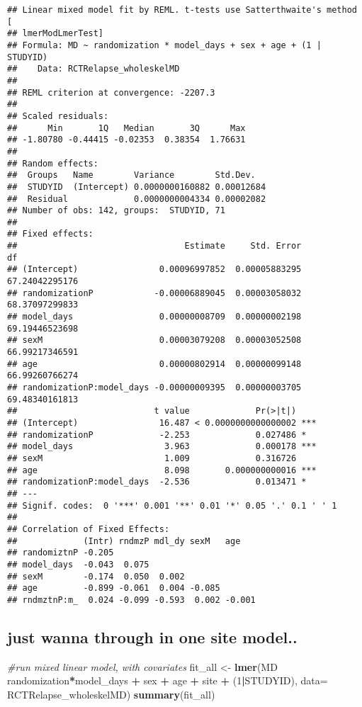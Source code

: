 \documentclass[]{article}
\newenvironment{Shaded}{\begin{snugshade}}{\end{snugshade}}
\newcommand{\KeywordTok}[1]{\textcolor[rgb]{0.13,0.29,0.53}{\textbf{#1}}}
\newcommand{\DataTypeTok}[1]{\textcolor[rgb]{0.13,0.29,0.53}{#1}}
\newcommand{\DecValTok}[1]{\textcolor[rgb]{0.00,0.00,0.81}{#1}}
\newcommand{\StringTok}[1]{\textcolor[rgb]{0.31,0.60,0.02}{#1}}
\newcommand{\CommentTok}[1]{\textcolor[rgb]{0.56,0.35,0.01}{\textit{#1}}}
\newcommand{\OperatorTok}[1]{\textcolor[rgb]{0.81,0.36,0.00}{\textbf{#1}}}
\newcommand{\NormalTok}[1]{#1}
\theoremstyle{definition}
\theoremstyle{definition}
\theoremstyle{definition}
\theoremstyle{remark}
\begin{document}
\begin{verbatim}
## Linear mixed model fit by REML. t-tests use Satterthwaite's method [
## lmerModLmerTest]
## Formula: MD ~ randomization * model_days + sex + age + (1 | STUDYID)
##    Data: RCTRelapse_wholeskelMD
## 
## REML criterion at convergence: -2207.3
## 
## Scaled residuals: 
##      Min       1Q   Median       3Q      Max 
## -1.80780 -0.44415 -0.02353  0.38354  1.76631 
## 
## Random effects:
##  Groups   Name        Variance        Std.Dev.  
##  STUDYID  (Intercept) 0.0000000160882 0.00012684
##  Residual             0.0000000004334 0.00002082
## Number of obs: 142, groups:  STUDYID, 71
## 
## Fixed effects:
##                                 Estimate     Std. Error             df
## (Intercept)                0.00096997852  0.00005883295 67.24042295176
## randomizationP            -0.00006889045  0.00003058032 68.37097299833
## model_days                 0.00000008709  0.00000002198 69.19446523698
## sexM                       0.00003079208  0.00003052508 66.99217346591
## age                        0.00000802914  0.00000099148 66.99260766274
## randomizationP:model_days -0.00000009395  0.00000003705 69.48340161813
##                           t value             Pr(>|t|)    
## (Intercept)                16.487 < 0.0000000000000002 ***
## randomizationP             -2.253             0.027486 *  
## model_days                  3.963             0.000178 ***
## sexM                        1.009             0.316726    
## age                         8.098       0.000000000016 ***
## randomizationP:model_days  -2.536             0.013471 *  
## ---
## Signif. codes:  0 '***' 0.001 '**' 0.01 '*' 0.05 '.' 0.1 ' ' 1
## 
## Correlation of Fixed Effects:
##             (Intr) rndmzP mdl_dy sexM   age   
## randomiztnP -0.205                            
## model_days  -0.043  0.075                     
## sexM        -0.174  0.050  0.002              
## age         -0.899 -0.061  0.004 -0.085       
## rndmztnP:m_  0.024 -0.099 -0.593  0.002 -0.001
\end{verbatim}

\subsection{just wanna through in one site
model..}\label{just-wanna-through-in-one-site-model..-1}

\begin{Shaded}
\begin{Highlighting}[]
\CommentTok{#run mixed linear model, with covariates}
\NormalTok{fit_all <-}\StringTok{ }\KeywordTok{lmer}\NormalTok{(MD }\OperatorTok{~}\StringTok{ }\NormalTok{randomization}\OperatorTok{*}\NormalTok{model_days }\OperatorTok{+}\StringTok{ }\NormalTok{sex }\OperatorTok{+}\StringTok{ }\NormalTok{age }\OperatorTok{+}\StringTok{ }\NormalTok{site }\OperatorTok{+}\StringTok{ }\NormalTok{(}\DecValTok{1}\OperatorTok{|}\NormalTok{STUDYID), }\DataTypeTok{data=}\NormalTok{ RCTRelapse_wholeskelMD)}
\KeywordTok{summary}\NormalTok{(fit_all)}
\end{Highlighting}
\end{Shaded}
\end{document}
